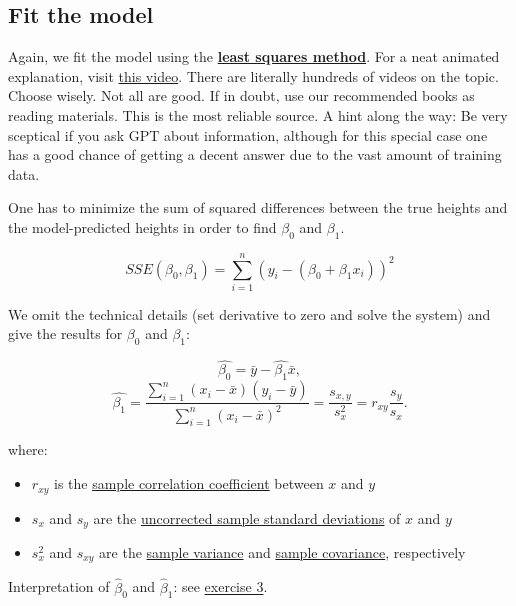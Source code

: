 \documentclass[
]{book}
\providecommand{\tightlist}{%
  \setlength{\itemsep}{0pt}\setlength{\parskip}{0pt}}
\begin{document}
\subsection{Fit the model}\label{fit_model_simple_lin_reg_classic}

Again, we fit the model using the \href{https://en.wikipedia.org/wiki/Least_squares}{\textbf{least squares method}}.
For a neat animated explanation,
visit \href{https://www.youtube.com/watch?v=jEEJNz0RK4Q&ab_channel=COCCmath}{this video}.
There are literally hundreds of videos on the topic. Choose wisely. Not all are good.
If in doubt, use our recommended books as reading materials. This is the most reliable source.
A hint along the way: Be very sceptical if you ask GPT about information,
although for this special case one has a good chance of getting a decent answer due to
the vast amount of training data.

One has to minimize the sum of squared differences between the true heights and
the model-predicted heights in order to find \(\beta_0\) and \(\beta_1\).

\[SSE(\beta_0, \beta_1) = \sum_{i=1}^n (y_i - (\beta_0 + \beta_1 x_i))^2\]

We omit the technical details (set derivative to zero and solve the system) and give the results for \(\beta_0\) and \(\beta_1\):

\[
\hat{\beta_0} = \bar{y} - \hat{\beta_1} \bar{x},
\]
\[
\hat{\beta_1} = \frac{\sum_{i=1}^n (x_i - \bar{x})(y_i - \bar{y})}{\sum_{i=1}^n (x_i - \bar{x})^2} =
 \frac{s_{x,y}}{s_x^2} = r_{xy} \frac{s_y}{s_x}.
\]

where:

\begin{itemize}
\tightlist
\item
  \(r_{xy}\) is the \href{https://en.wikipedia.org/wiki/Pearson_correlation_coefficient}{sample correlation coefficient} between \(x\) and \(y\)
\item
  \(s_x\) and \(s_y\) are the \href{https://en.wikipedia.org/wiki/Standard_deviation}{uncorrected sample standard deviations} of \(x\) and \(y\)
\item
  \(s_x^2\) and \(s_{xy}\) are the \href{https://en.wikipedia.org/wiki/Variance}{sample variance} and \href{https://en.wikipedia.org/wiki/Covariance}{sample covariance}, respectively
\end{itemize}

Interpretation of \(\hat{\beta}_0\) and \(\hat{\beta}_1\): see \hyperref[exercise3_simpl_lin_reg]{exercise 3}.
\end{document}
